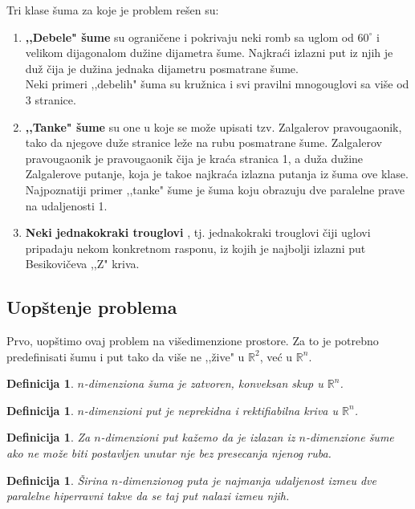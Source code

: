 \documentclass[11pt]{article}
\newtheorem{df}[teo]{\bf Definicija}
\begin{document}
Tri klase \v suma za koje je problem re\v sen su:
\begin{enumerate}
\item \textbf{,,Debele" \v sume} \cite{Finch} su ograni\v cene i pokrivaju neki romb sa uglom od $60^\circ$ i velikom dijagonalom du\v zine dijametra \v sume. Najkra\' ci izlazni put iz njih je du\v z \v cija je du\v zina jednaka dijametru posmatrane \v sume. 
\\
Neki primeri  ,,debelih" \v suma su kru\v znica i svi pravilni mnogouglovi sa vi\v se od 3 stranice.
\item \textbf{,,Tanke" \v sume} \cite{Zalgaller} su one u koje se mo\v ze upisati tzv. Zalgalerov pravougaonik, tako da njegove du\v ze stranice le\v ze na rubu posmatrane \v sume. Zalgalerov pravougaonik je pravougaonik \v cija je kra\' ca stranica 1, a du\v za du\v zine Zalgalerove putanje, koja je tako\dj e najkra\' ca izlazna putanja iz \v suma ove klase.
\\
Najpoznatiji primer ,,tanke" \v sume je \v suma koju obrazuju dve paralelne prave na udaljenosti 1.
\item \textbf{Neki jednakokraki trouglovi} \cite{Besikovic}, tj. jednakokraki trouglovi \v ciji uglovi pripadaju nekom konkretnom rasponu, iz kojih je najbolji izlazni put Besikovi\v ceva ,,Z" kriva.
\end{enumerate}
\smallskip
\subsection[Uop\v stenje problema]{Uop\v stenje problema}
\bigskip
Prvo, uop\v stimo ovaj problem na vi\v sedimenzione prostore. Za to je potrebno predefinisati \v sumu i put tako da vi\v se ne ,,\v zive" u $\mathbb{R}^2$, ve\' c u $\mathbb{R}^n$.
\smallskip
\begin{df} $n$-dimenziona \v suma je zatvoren, konveksan skup u $\mathbb{R}^n$.\end{df}
\begin{df} $n$-dimenzioni put je neprekidna i rektifiabilna kriva u $\mathbb{R}^n$.\end{df}
\begin{df} Za $n$-dimenzioni put ka\v zemo da je izlazan iz $n$-dimenzione \v sume ako ne mo\v ze biti postavljen unutar nje bez presecanja njenog ruba.\end{df}
\begin{df} \v Sirina $n$-dimenzionog puta je najmanja udaljenost izme\dj u dve paralelne hiperravni takve da se taj put nalazi izme\dj u njih. \end{df}
\smallskip
\end{document}
